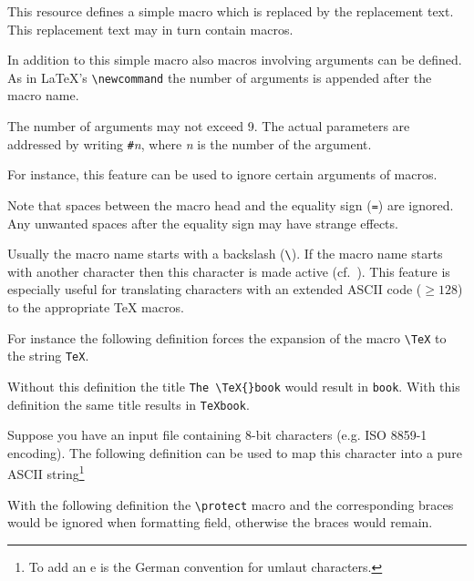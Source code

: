 \documentclass[11pt,a4paper]{scrbook}
\begin{document}
This resource defines a simple macro which is replaced by the replacement
text. This replacement text may in turn contain macros.

In addition to this simple macro also macros involving arguments can be
defined. As in \LaTeX's \verb|\newcommand| the number of arguments is appended
after the macro name.

\begin{Resources}
\end{Resources}

The number of arguments may not exceed 9. The actual parameters are addressed
by writing \texttt{\#}\textit{n}, where \textit{n} is the number of the argument.

For instance, this feature can be used to ignore certain arguments of macros.

Note that spaces between the macro head and the equality sign (\verb|=|) are
ignored. Any unwanted spaces after the equality sign may have strange effects.

Usually the macro name starts with a backslash (\verb|\|). If the macro name
starts with another character then this character is made active
(cf.~\cite{knuth:texbook}). This feature is especially useful for translating
characters with an extended ASCII code (\(\geq128\)) to the appropriate \TeX{}
macros.

For instance the following definition forces the expansion of the macro
\verb|\TeX| to the string \verb|TeX|.

\begin{Resources}
\end{Resources}

Without this definition the title \verb|The \TeX{}book| would result in
\verb|book|. With this definition the same title results in \verb|TeXbook|.

Suppose you have an input file containing 8-bit characters (e.g. ISO 8859-1
encoding). The following definition can be used to map this character into a
pure ASCII string\footnote{To add an e is the German convention for umlaut
  characters.}

\begin{Resources}
\end{Resources}

With the following definition the \verb|\protect| macro and the corresponding 
braces would be ignored when formatting field, otherwise the braces would 
remain.
\end{document}
